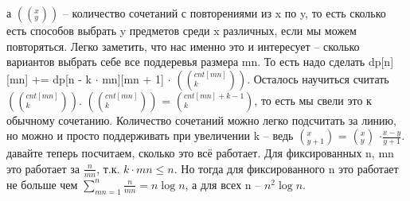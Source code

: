 \documentclass[12pt]{article}
\begin{document}
\begin{enumerate}
    а $((^x_y))$ -- количество сочетаний с повторениями из x по y, то есть сколько есть 
    способов выбрать y предметов среди x различных, если мы можем повторяться. Легко заметить, 
    что нас именно это и интересует -- сколько вариантов выбрать себе все поддеревья размера 
    mn. То есть надо сделать dp[n][mn] += dp[n - k $\cdot$ mn][mn + 1] $\cdot$ $((^{cnt[mn]}_k))$. 
    Осталось научиться считать $((^{cnt[mn]}_k))$. $((^{cnt[mn]}_k))$ = $(^{cnt[mn] + k - 1}_k)$, 
    то есть мы свели это к обычному сочетанию. Количество сочетаний можно легко подсчитать за 
    линию, но можно и просто поддерживать при увеличении k -- ведь $(^x_{y + 1})$ = $(^x_y)$ 
    $\cdot \frac{x - y}{y + 1}$. \\
    давайте теперь посчитаем, сколько это всё работает. Для фиксированных n, mn это работает за 
    $\frac{n}{mn}$, т.к. $k \cdot mn \le n$. Но тогда для фиксированного n это работает не больше 
    чем $\sum^n_{mn = 1}\frac{n}{mn} = n\log n$, а для всех n -- $n^2\log n$. \\
\end{enumerate}
\end{document}
